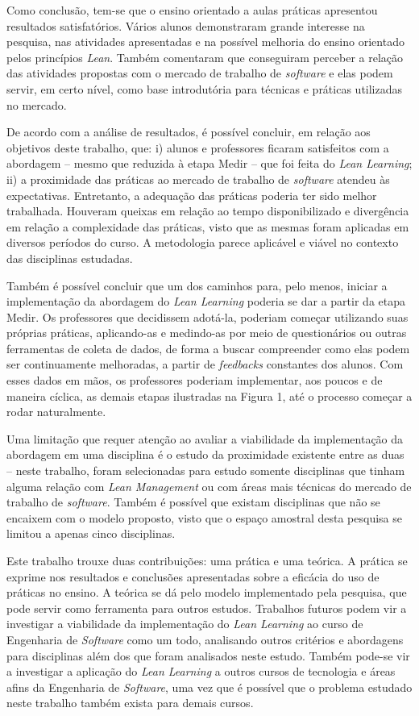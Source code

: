 Como conclusão, tem-se que o ensino orientado a aulas práticas apresentou resultados satisfatórios. Vários alunos demonstraram grande interesse na pesquisa, nas atividades apresentadas e na possível melhoria do ensino orientado pelos princípios \textit{Lean}. Também comentaram que conseguiram perceber a relação das atividades propostas com o mercado de trabalho de \textit{software} e elas podem servir, em certo nível, como base introdutória para técnicas e práticas utilizadas no mercado.

De acordo com a análise de resultados, é possível concluir, em relação aos objetivos deste trabalho, que: i) alunos e professores ficaram satisfeitos com a abordagem -- mesmo que reduzida à etapa Medir -- que foi feita do \textit{Lean Learning}; ii) a proximidade das práticas ao mercado de trabalho de \textit{software} atendeu às expectativas. Entretanto, a adequação das práticas poderia ter sido melhor trabalhada. Houveram queixas em relação ao tempo disponibilizado e divergência em relação a complexidade das práticas, visto que as mesmas foram aplicadas em diversos períodos do curso. A metodologia parece aplicável e viável no contexto das disciplinas estudadas.

Também é possível concluir que um dos caminhos para, pelo menos, iniciar a implementação da abordagem do \textit{Lean Learning} poderia se dar a partir da etapa Medir. Os professores que decidissem adotá-la, poderiam começar utilizando suas próprias práticas, aplicando-as e medindo-as por meio de questionários ou outras ferramentas de coleta de dados, de forma a buscar compreender como elas podem ser continuamente melhoradas, a partir de \textit{feedbacks} constantes dos alunos. Com esses dados em mãos, os professores poderiam implementar, aos poucos e de maneira cíclica, as demais etapas ilustradas na Figura 1, até o processo começar a rodar naturalmente. 

Uma limitação que requer atenção ao avaliar a viabilidade da implementação da abordagem em uma disciplina é o estudo da proximidade existente entre as duas -- neste trabalho, foram selecionadas para estudo somente disciplinas que tinham alguma relação com \textit{Lean Management} ou com áreas mais técnicas do mercado de trabalho de \textit{software}. Também é possível que existam disciplinas que não se encaixem com o modelo proposto, visto que o espaço amostral desta pesquisa se limitou a apenas cinco disciplinas.

Este trabalho trouxe duas contribuições: uma prática e uma teórica. A prática se exprime nos resultados e conclusões apresentadas sobre a eficácia do uso de práticas no ensino. A teórica se dá pelo modelo implementado pela pesquisa, que pode servir como ferramenta para outros estudos. Trabalhos futuros podem vir a investigar a viabilidade da implementação do \textit{Lean Learning} ao curso de Engenharia de \textit{Software} como um todo, analisando outros critérios e abordagens para disciplinas além dos que foram analisados neste estudo. Também pode-se vir a investigar a aplicação do \textit{Lean Learning} a outros cursos de tecnologia e áreas afins da Engenharia de \textit{Software}, uma vez que é possível que o problema estudado neste trabalho também exista para demais cursos.